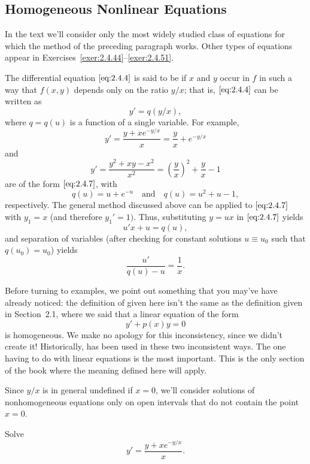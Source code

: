 \documentclass{ximera}
\begin{document}
\subsection*{Homogeneous Nonlinear Equations}

In the text  we'll consider only the most widely studied class of
equations for which the method of the preceding paragraph works.
Other types of equations appear in
Exercises~\ref{exer:2.4.44}--\ref{exer:2.4.51}.

The differential equation $\eqref{eq:2.4.4}$
is said to be  if  $x$ and $y$
occur in $f$ in such a way that  $f(x,y)$ depends only
on the ratio $y/x$; that is, $\eqref{eq:2.4.4}$ can be written as
\begin{equation} \label{eq:2.4.7}
y'=q(y/x),
\end{equation}
where $q=q(u)$ is a function of a single variable.
For example,
$$
y'=\frac{y+xe^{-y/x}}{x}=\frac{y}{x}+e^{-y/x}
$$
and
$$
y'=\frac{y^2+xy-x^2}{x^2}=\left(\frac{y}{x}\right)^2+\frac{y}{x}
-1
$$
are of the form  $\eqref{eq:2.4.7}$, with
$$
q(u)=u+e^{-u}\quad\text{and}\quad q(u)=u^2+u-1,
$$
respectively. The general method discussed above can be
applied to
$\eqref{eq:2.4.7}$ with $y_1=x$ (and therefore $y_1'=1)$. Thus,
substituting $y=ux$ in $\eqref{eq:2.4.7}$ yields
$$
u'x+u=q(u),
$$
and separation of variables (after checking for constant
solutions $u\equiv u_0$ such that $q(u_0)=u_0$) yields
$$
\frac{u'}{q(u)-u}=\frac{1}{x}.
$$

Before turning to examples, we point out something that you may've have
already noticed:
 the definition of  given
here isn't  the same as the definition given in {\color{red} Section~2.1},
where we said that a linear equation of the form
$$
y'+p(x)y=0
$$
is homogeneous. We make no apology for this inconsistency, since we
didn't create it!  Historically,  has been
used in these two inconsistent ways. The one
having to do with linear equations is the most important. This
is the only section of the book where the meaning defined here will
apply.

Since $y/x$ is in general undefined if $x=0$, we'll consider
solutions of nonhomogeneous equations only on open intervals that do
not contain the point $x=0$.

\begin{example}\label{example:2.4.2}
Solve
\begin{equation} \label{eq:2.4.8}
y'=\frac{y+xe^{-y/x}}{x}.
\end{equation}
\end{example}
\end{document}
